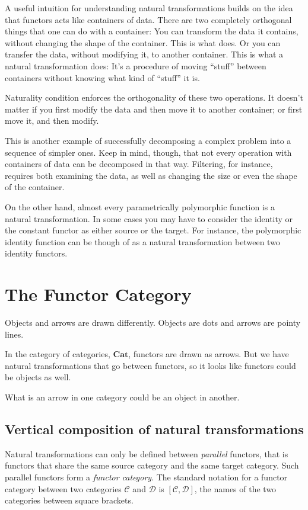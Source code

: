 \documentclass[DaoFP]{subfiles}
\begin{document}
A useful intuition for understanding natural transformations builds on the idea that functors acts like containers of data. There are two completely orthogonal things that one can do with a container: You can transform the data it contains, without changing the shape of the container. This is what  does. Or you can transfer the data, without modifying it, to another container. This is what a natural transformation does: It's a procedure of moving ``stuff'' between containers without knowing what kind of ``stuff'' it is. 

Naturality condition enforces the orthogonality of these two operations. It doesn't matter if you first modify the data and then move it to another container; or first move it, and then modify. 

This is another example of successfully decomposing a complex problem into a sequence of simpler ones. Keep in mind, though, that not every operation with containers of data can be decomposed in that way. Filtering, for instance, requires both examining the data, as well as changing the size or even the shape of the container. 

On the other hand, almost every parametrically polymorphic function is a natural transformation. In some cases you may have to consider the identity or the constant functor as either source or the target. For instance, the polymorphic identity function can be though of as a natural transformation between two identity functors.

\section{The Functor Category}

Objects and arrows are drawn differently. Objects are dots and arrows are pointy lines.

In the category of categories, $\mathbf{Cat}$, functors are drawn as arrows. But we have natural transformations that go between functors, so it looks like functors could be objects as well. 

What is an arrow in one category could be an object in another.

\subsection{Vertical composition of natural transformations}

Natural transformations can only be defined between \emph{parallel} functors, that is functors that share the same source category and the same target category. Such parallel functors form a \emph{functor category}. The standard notation for a functor category between two categories $\mathcal{C}$ and $\mathcal{D}$ is $[\mathcal{C}, \mathcal{D}]$, the names of the two categories between square brackets.
\end{document}
